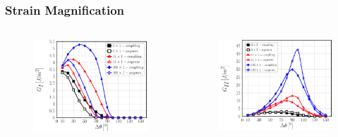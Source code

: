 \documentclass[first,firstsupp,lastsupp,last,hyperref,table]{ETHclass}
\begin{document}
\begin{frame}
\frametitle{\vspace{0.2cm}\small Strain Magnification}
\vspace{-1cm}
\centering
\begin{columns}[c]
\centering
\begin{column}{0.5\textwidth}
\centering
\begin{figure}
\centering
\includegraphics[width=\columnwidth]{nx1-coupling-vf60-GI-strainmagn101.pdf}
\end{figure}
\end{column}
\begin{column}{0.5\textwidth}
\centering
\begin{figure}
\centering
\includegraphics[width=\columnwidth]{nx1-coupling-vf60-GII-strainmagn101.pdf}

\end{figure}
\end{column}
\end{columns}
\end{frame}
\end{document}
